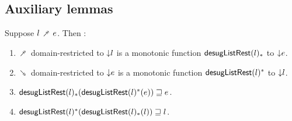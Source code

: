 \subsection{Auxiliary lemmas}

\begin{lemma}
  Suppose $l \dfwdarrow e$. Then :
  \begin{enumerate}
     \item $\dfwdarrow$ domain-restricted to ${\downarrow}{l}$ is a monotonic function $\mathsf{desugListRest}(l)_*$ to ${\downarrow}{e}$.
     \item $\dbwdarrow$ domain-restricted to ${\downarrow}{e}$ is a monotonic function $\mathsf{desugListRest}(l)^*$ to ${\downarrow}{l}$.
     \item $\mathsf{desugListRest}(l)_*(\mathsf{desugListRest}(l)^*(e)) \sqsupseteq e$.
     \item $\mathsf{desugListRest}(l)^*(\mathsf{desugListRest}(l)_*(l)) \sqsupseteq l$.
  \end{enumerate}
\end{lemma}

